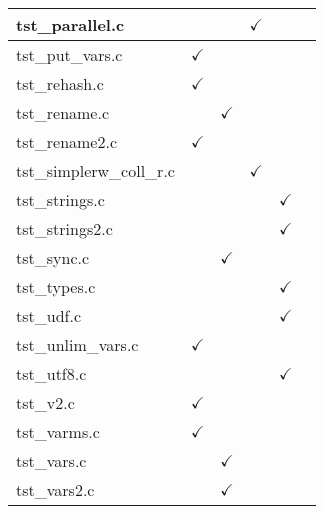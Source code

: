 \begin{table}[H]
\begin{tabular}{|l|c|c|c|c|c|}
tst\_parallel.c         &               &               & $\checkmark$  &               &               \\ \hline
tst\_put\_vars.c        & $\checkmark$  &               &               &               &               \\ \hline
tst\_rehash.c           & $\checkmark$  &               &               &               &               \\ \hline
tst\_rename.c           &               & $\checkmark$  &               &               &               \\ \hline
tst\_rename2.c          & $\checkmark$  &               &               &               &               \\ \hline
tst\_simplerw\_coll\_r.c   &            &               & $\checkmark$  &               &               \\ \hline
tst\_strings.c          &               &               &               & $\checkmark$  &               \\ \hline
tst\_strings2.c         &               &               &               & $\checkmark$  &               \\ \hline
tst\_sync.c             &               & $\checkmark$  &               &               &               \\ \hline
tst\_types.c            &               &               &               & $\checkmark$  &               \\ \hline
tst\_udf.c              &               &               &               & $\checkmark$  &               \\ \hline
tst\_unlim\_vars.c      & $\checkmark$  &               &               &               &               \\ \hline
tst\_utf8.c             &               &               &               & $\checkmark$  &               \\ \hline
tst\_v2.c               & $\checkmark$  &               &               &               &               \\ \hline
tst\_varms.c            & $\checkmark$  &               &               &               &               \\ \hline
tst\_vars.c             &               & $\checkmark$  &               &               &               \\ \hline
tst\_vars2.c            &               & $\checkmark$  &               &               &               \\ \hline

\end{tabular}
\end{table}

